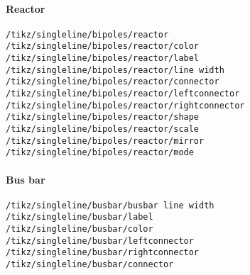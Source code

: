 \documentclass[a4]{article}
\begin{document}
\begin{footnotesize}
\paragraph{Reactor}
\begin{verbatim}
/tikz/singleline/bipoles/reactor
/tikz/singleline/bipoles/reactor/color
/tikz/singleline/bipoles/reactor/label
/tikz/singleline/bipoles/reactor/line width
/tikz/singleline/bipoles/reactor/connector
/tikz/singleline/bipoles/reactor/leftconnector
/tikz/singleline/bipoles/reactor/rightconnector
/tikz/singleline/bipoles/reactor/shape
/tikz/singleline/bipoles/reactor/scale
/tikz/singleline/bipoles/reactor/mirror
/tikz/singleline/bipoles/reactor/mode
\end{verbatim}
\paragraph{Bus bar}
\begin{verbatim}
/tikz/singleline/busbar/busbar line width
/tikz/singleline/busbar/label
/tikz/singleline/busbar/color
/tikz/singleline/busbar/leftconnector
/tikz/singleline/busbar/rightconnector
/tikz/singleline/busbar/connector
\end{verbatim}
\end{footnotesize}
\onecolumn
\end{document}
